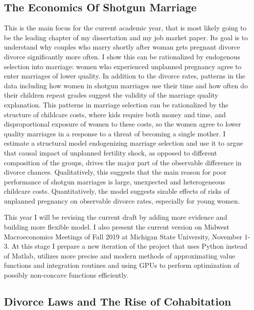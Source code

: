 \documentclass[12pt,letter]{article}
\begin{document}
\subsection*{The Economics Of Shotgun Marriage}

This is the main focus for the current academic year, that is most likely going to be the leading chapter of my dissertation and my job market paper. Its goal is to understand why couples who marry shortly after woman gets pregnant divorce divorce significantly more often. I show this can be rationalized by endogenous selection into marriage: women who experienced unplanned pregnancy agree to enter marriages of lower quality. In addition to the divorce rates, patterns in the data including how women in shotgun marriages use their time and how often do their children repeat grades suggest the validity of the marriage quality explanation. This patterns in marriage selection can be rationalized by the structure of childcare costs, where kids require both money and time, and disproportional exposure of women to these costs, so the women agree to lower quality marriages in a response to a threat of becoming a single mother. I estimate a structural model endogenizing marriage selection and use it to argue that causal impact of unplanned fertility shock, as opposed to different composition of the groups, drives the major part of the observable difference in divorce chances. Qualitatively, this suggests that the main reason for poor performance of shotgun marriages is large, unexpected and heterogeneous childcare costs. Quantitatively, the model suggests sizable effects of risks of unplanned pregnancy on observable divorce rates, especially for young women.

This year I will be revising the current draft by adding more evidence and building more flexible model. I also present the current version on Midwest Macroeconomics Meetings of Fall 2019 at Michigan State University, November 1-3. At this stage I prepare a new iteration of the project that uses Python instead of Matlab, utilizes more precise and modern methods of approximating value functions and integration routines and using GPUs to perform optimization of possibly non-concave functions efficiently.

\subsection*{Divorce Laws and The Rise of Cohabitation}
\end{document}
